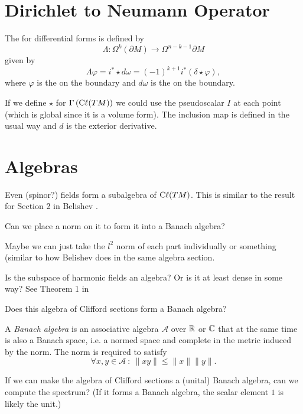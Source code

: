\section{Dirichlet to Neumann Operator}

The  for differential forms is defined by
\[
\Lambda \colon \Omega^k(\partial M) \to \Omega^{n-k-1}{\partial M}
\]
given by
\[
\Lambda \varphi = i^* \star d \omega=(-1)^{k+1}i^*(\delta \star \varphi),
\]
where $\varphi$ is the  on the boundary and $d\omega$ is the  on the boundary.

If we define $\star$ for $\Gamma\left(\mathrm{C}\ell(TM)\right)$ we could use the pseudoscalar $I$ at each point (which is global since it is a volume form). The inclusion map is defined in the usual way and $d$ is the exterior derivative.  

\section{Algebras}
Even (spinor?) fields form a subalgebra of $\mathrm{C}\ell(TM)$.  This is similar to the result for Section 2 in Belishev \cite{belishev_quaternion}. 
\begin{question}
Can we place a norm on it to form it into a Banach algebra? 
\end{question}

Maybe we can just take the $l^2$ norm of each part individually or something (similar to how Belishev does in the same algebra section.

\begin{question}
Is the subspace of harmonic fields an algebra? Or is it at least dense in some way? See Theorem 1 in \cite{belishev_quaternion}
\end{question}

\begin{question}
Does this algebra of Clifford sections form a Banach algebra?
\end{question}

\begin{definition}
A \emph{Banach algebra} is an associative algebra $\mathcal{A}$ over $\mathbb{R}$ or $\mathbb{C}$ that at the same time is also a Banach space, i.e. a normed space and complete in the metric induced by the norm. The norm is required to satisfy
\[
\forall x,y \in \mathcal{A}~\colon~ \|xy\|\leq \|x\|\|y\|.
\]
\end{definition}

\begin{question}
If we can make the algebra of Clifford sections a (unital) Banach algebra, can we compute the spectrum? (If it forms a Banach algebra, the scalar element $1$ is likely the unit.)
\end{question}

